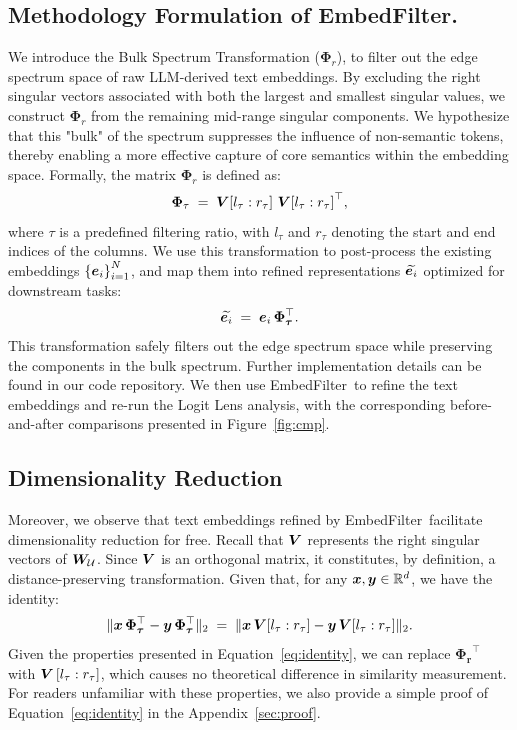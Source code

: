\documentclass[sigconf]{acmart}
\newcommand{\name}{EmbedFilter}
\begin{document}
\subsection{Methodology Formulation of \name.} 
We introduce the Bulk Spectrum Transformation ($\bm{\Phi}_r$), to filter out the edge spectrum space of raw LLM-derived text embeddings.
By excluding the right singular vectors associated with both the largest and smallest singular values, we construct \(\bm\Phi_r\) from the remaining mid-range singular components. 
We hypothesize that this "bulk" of the spectrum suppresses the influence of non-semantic tokens, thereby enabling a more effective capture of core semantics within the embedding space.
Formally, the matrix \(\bm\Phi_r\) is defined as:
{\Large \begin{equation*}
    \label{eq:filter}
    \bm\Phi_{\tau} \; = \; {\bm{V}}{\left[l_\tau:r_\tau\right]
    \, {\bm{V}}{\left[l_\tau:r_\tau\right]}^{\top}},
\end{equation*}}
where \(\tau\) is a predefined filtering ratio, with \(l_\tau\) and \(r_\tau\) denoting the start and end indices of the columns.
We use this transformation to post-process the existing embeddings \(\left\{{\bm{e}}_i\right\}_{i=1}^{N}\),
and map them into refined representations \(\widetilde{{\bm{e}}_i}\) optimized for downstream tasks:
{\Large \[
    \widetilde{{\bm{e}}_i} \; = \; {\bm{e}}_i \, \bm{\Phi_\tau}^\top.
\]}
This transformation safely filters out the edge spectrum space while preserving the components in the bulk spectrum. 
Further implementation details can be found in our code repository.
We then use \name\ to refine the text embeddings and re-run the Logit Lens analysis, with the corresponding before-and-after comparisons presented in Figure~\ref{fig:cmp}.

\subsection{Dimensionality Reduction}
Moreover, we observe that text embeddings refined by \name\ facilitate dimensionality reduction for free.
Recall that \({\bm{V}}\) represents the right singular vectors of \({\bm{W}}_{\mathcal{U}}\).
Since \({\bm{V}}\) is an orthogonal matrix, it constitutes, by definition, a distance-preserving transformation.
Given that, for any \({\bm{x}},{\bm{y}} \in \mathbb{R}^d\), we have the identity:
{\Large \begin{equation}
    \label{eq:identity}
    \|{\bm{x}} \, \bm{\Phi_\tau}^\top - {\bm{y}} \, \bm{\Phi_\tau}^\top\|_2 \; = \; \|{\bm{x}} \,{\bm{V}}{\left[l_\tau:r_\tau\right]} - {\bm{y}} \, {\bm{V}}{\left[l_\tau:r_\tau\right]}\|_2.
\end{equation}}
Given the properties presented in Equation~\ref{eq:identity}, we can replace \(\bm{\Phi_r}^\top\) with \({\bm{V}}\left[l_\tau:r_\tau\right]\), which causes no theoretical difference in similarity measurement.
For readers unfamiliar with these properties, we also provide a simple proof of Equation~\ref{eq:identity} in the Appendix~\ref{sec:proof}.
\end{document}
